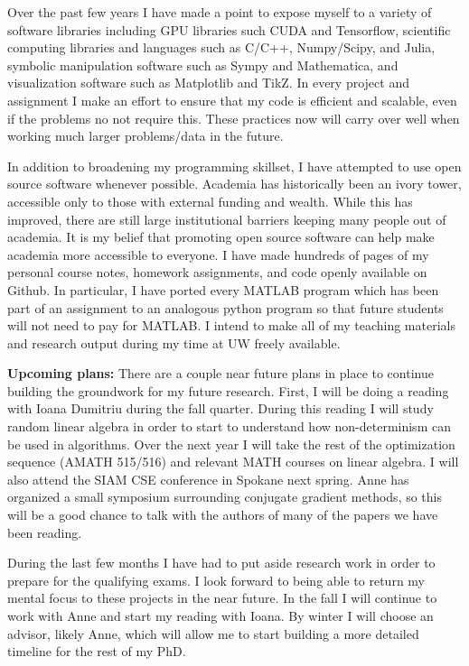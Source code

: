 \documentclass[11pt]{article}
\begin{document}
Over the past few years I have made a point to expose myself to a variety of software libraries including GPU libraries such CUDA and Tensorflow, scientific computing libraries and languages such as C/C++, Numpy/Scipy, and Julia, symbolic manipulation software such as Sympy and Mathematica, and visualization software such as Matplotlib and TikZ. In every project and assignment I make an effort to ensure that my code is efficient and scalable, even if the problems no not require this. These practices now will carry over well when working much larger problems/data in the future.

In addition to broadening my programming skillset, I have attempted to use open source software whenever possible. 
Academia has historically been an ivory tower, accessible only to those with external funding and wealth. While this has improved, there are still large institutional barriers keeping many people out of academia. It is my belief that promoting open source software can help make academia more accessible to everyone.
I have made hundreds of pages of my personal course notes, homework assignments, and code openly available on Github. In particular, I have ported every MATLAB program which has been part of an assignment to an analogous python program so that future students will not need to pay for MATLAB. 
I intend to make all of my teaching materials and research output during my time at UW freely available.


\textbf{Upcoming plans:}
There are a couple near future plans in place to continue building the groundwork for my future research. First, I will be doing a reading with Ioana Dumitriu during the fall quarter.
During this reading I will study random linear algebra in order to start to understand how non-determinism can be used in algorithms. 
Over the next year I will take the rest of the optimization sequence (AMATH 515/516) and relevant MATH courses on linear algebra.
I will also attend the SIAM CSE conference in Spokane next spring. Anne has organized a small symposium surrounding conjugate gradient methods, so this will be a good chance to talk with the authors of many of the papers we have been reading.


During the last few months I have had to put aside research work in order to prepare for the qualifying exams. I look forward to being able to return my mental focus to these projects in the near future. In the fall I will continue to work with Anne and start my reading with Ioana. By winter I will choose an advisor, likely Anne, which will allow me to start building a more detailed timeline for the rest of my PhD.






\end{document}
